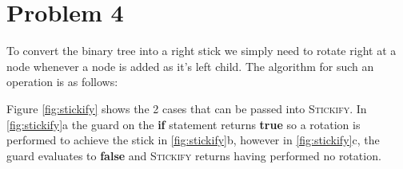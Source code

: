 \documentclass{article}
\begin{document}
\section*{Problem 4}
To convert the binary tree into a right stick we simply need to rotate right at a node whenever a node is added as it's left child. The algorithm for such an operation is as follows:\\[2mm]
\begin{algorithm}[H]
    \DontPrintSemicolon
    \SetAlgoNoLine
    \;
    \label{alg:stickify}
\end{algorithm}
\noindent Figure \ref{fig:stickify} shows the 2 cases that can be passed into \textsc{Stickify}. In \ref{fig:stickify}a the guard on the \textbf{if} statement returns \textbf{true} so a rotation is performed to achieve the stick in \ref{fig:stickify}b, however in \ref{fig:stickify}c, the guard evaluates to \textbf{false} and \textsc{Stickify} returns having performed no rotation.
\end{document}

